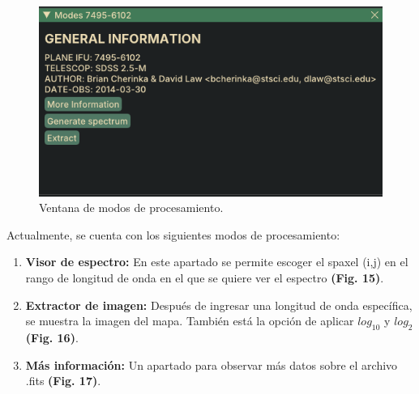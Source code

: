 \documentclass[9pt,twocolumn,a4paper]{opticajnl}
\begin{document}
\begin{figure}
    \centering
    \includegraphics[width=1\linewidth]{modes.png}
    \caption{Ventana de modos de procesamiento.}
    \label{fig:modes}
\end{figure}

Actualmente, se cuenta con los siguientes modos de procesamiento:

\begin{enumerate}
    \item \textbf{Visor de espectro:} En este apartado se permite escoger el spaxel (i,j) en el rango de longitud de onda en el que se quiere ver el espectro \textbf{(Fig. 15)}.
    \item \textbf{Extractor de imagen:} Después de ingresar una longitud de onda específica, se muestra la imagen del mapa. También está la opción de aplicar $log_{10}$ y $log_{2}$ \textbf{(Fig. 16)}.
    \item \textbf{Más información:} Un apartado para observar más datos sobre el archivo .fits \textbf{(Fig. 17)}.
\end{enumerate}
\end{document}
